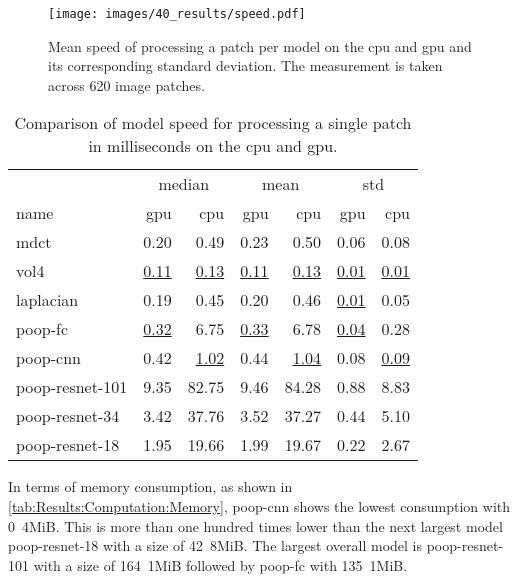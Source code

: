 \begin{figure}
    \centering
    \texttt{[image: images/40\_results/speed.pdf]}
    \caption[Patch processing speed]{Mean speed of processing a patch per model on the \ac{cpu} and \ac{gpu} and its corresponding standard deviation. The measurement is taken across 620 image patches.}
    \label{fig:Results:Computation:Speed}
\end{figure}

\begin{table}[ht]
    \centering
    \caption[Patch processing speed]{Comparison of model speed for processing a single patch in milliseconds on the \ac{cpu} and \ac{gpu}.}
    \label{tab:Results:Computation:Speed}
    \begin{tabular}{@{\extracolsep{6pt}}lrrrrrr@{}}
        \hline
        \multicolumn{1}{c}{} & \multicolumn{2}{c}{median} & \multicolumn{2}{c}{mean} & \multicolumn{2}{c}{\acs{std}} \\
        \cline{2-3}\cline{4-5}\cline{6-7}
        name & \acs{gpu} & \acs{cpu} & \acs{gpu} & \acs{cpu} & \acs{gpu} & \acs{cpu} \\
        \hline
        \acs{mdct}                      & 0.20 &  0.49 & 0.23 &  0.50 & 0.06 & 0.08 \\
        \acs{vol4}                      & \underline{0.11} &  \underline{0.13} & \underline{0.11} &  \underline{0.13} & \underline{0.01} & \underline{0.01} \\
        \acs{laplacian}                 & 0.19 &  0.45 & 0.20 &  0.46 & \underline{0.01} & 0.05 \\
        \hline
        \acs{poop}-\acs{fc}             & \underline{0.32} &  6.75 & \underline{0.33} &  6.78 & \underline{0.04} & 0.28 \\
        \acs{poop}-\acs{cnn}            & 0.42 &  \underline{1.02} & 0.44 &  \underline{1.04} & 0.08 & \underline{0.09} \\
        \acs{poop}-\acs{resnet}-101     & 9.35 & 82.75 & 9.46 & 84.28 & 0.88 & 8.83 \\
        \acs{poop}-\acs{resnet}-34      & 3.42 & 37.76 & 3.52 & 37.27 & 0.44 & 5.10 \\
        \acs{poop}-\acs{resnet}-18      & 1.95 & 19.66 & 1.99 & 19.67 & 0.22 & 2.67 \\
    \end{tabular}
\end{table}

In terms of memory consumption, as shown in \autoref{tab:Results:Computation:Memory}, \ac{poop}-\ac{cnn} shows the lowest consumption with \unit{0.4}{MiB}. This is more than one hundred times lower than the next largest model \ac{poop}-\ac{resnet}-18 with a size of \unit{42.8}{MiB}. The largest overall model is \ac{poop}-\ac{resnet}-101 with a size of \unit{164.1}{MiB} followed by \ac{poop}-\ac{fc} with \unit{135.1}{MiB}.

